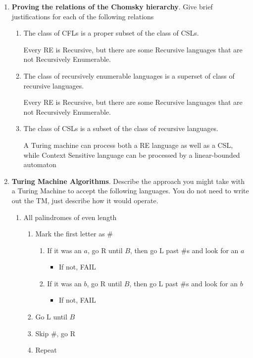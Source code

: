 \documentclass[12pt]{scrbook}
\begin{document}
\begin{enumerate}
  \item \textbf{Proving the relations of the Chomsky hierarchy}.  Give brief
    justifications for each of the following relations
    \begin{enumerate}
      \item The class of CFLs is a proper subset of the class of CSLs.

        Every RE is Recursive, but there are some Recursive languages that are
        not Recursively Enumerable.

      \item The class of recursively enumerable languages is a superset of class of recursive languages.

        Every RE is Recursive, but there are some Recursive languages that are
        not Recursively Enumerable.

      \item The class of CSLs is a subset of the class of recursive languages.

        A Turing machine can process both a RE language as well as a CSL, while
        Context Sensitive language can be processed by a linear-bounded automaton

    \end{enumerate}
  \item \textbf{Turing Machine Algorithms}.  Describe the approach you might take with a
    Turing Machine to accept the following languages. You do not need to
    write out the TM, just describe how it would operate.

      \begin{enumerate}
        \item All palindromes of even length

          \begin{enumerate}
            \item Mark the first letter as \#
              \begin{enumerate}
                \item If it was an $a$, go R until $B$, then go L past \#s and look for an $a$
                  \begin{itemize}
                    \item If not, FAIL
                  \end{itemize}
                \item If it was an $b$, go R until $B$, then go L past \#s and look for an $b$
                  \begin{itemize}
                    \item If not, FAIL
                  \end{itemize}
              \end{enumerate}
            \item Go L until $B$
            \item Skip \#, go R
            \item Repeat
          \end{enumerate}


\end{enumerate}
\end{enumerate}
\end{document}
